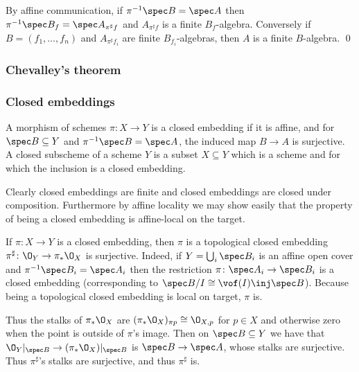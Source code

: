 \eprop

\bproof

    By affine communication, if $\pi^{-1}\spec B=\spec A$ then $\pi^{-1}\spec B_f=\spec A_{\pi^\sharp f}$ and $A_{\pi^\sharp f}$ is a finite $B_f$-algebra.
    Conversely if $B=(f_1,\dots,f_n)$ and $A_{\pi^\sharp f_i}$ are finite $B_{f_i}$-algebras, then $A$ is a finite $B$-algebra.
    \qed

\eproof

\subsubsection{Chevalley's theorem}


\subsubsection{Closed embeddings}

\bdefn

    A morphism of schemes $\pi\colon X\to Y$ is a {\emphcolor closed embedding} if it is affine, and for $\spec B\subseteq Y$ and
    $\pi^{-1}\spec B=\spec A$, the induced map $B\to A$ is surjective.
    A {\emphcolor closed subscheme} of a scheme $Y$ is a subset $X\subseteq Y$ which is a scheme and for which the inclusion is a closed
    embedding.

\edefn

Clearly closed embeddings are finite and closed embeddings are closed under composition.
Furthermore by affine locality we may show easily that the property of being a closed embedding is affine-local on the target.

\bremark

    If $\pi\colon X\to Y$ is a closed embedding, then $\pi$ is a topological closed embedding $\pi^\sharp\colon\O_Y\to\pi_*\O_X$ is surjective.
    Indeed, if $Y=\bigcup_i\spec B_i$ is an affine open cover and $\pi^{-1}\spec B_i=\spec A_i$ then the restriction
    $\pi\colon\spec A_i\to\spec B_i$ is a closed embedding (corresponding to $\spec B/I\cong\vof(I)\inj\spec B$).
    Because being a topological closed embedding is local on target, $\pi$ is.

    Thus the stalks of $\pi_*\O_X$ are $(\pi_*\O_X)_{\pi p}\cong\O_{X,p}$ for $p\in X$ and otherwise zero when the point is outside of
    $\pi$'s image.
    Then on $\spec B\subseteq Y$ we have that $\O_Y|_{\spec B}\to(\pi_*\O_X)|_{\spec B}$ is $\spec B\to\spec A$, whose stalks are surjective.
    Thus $\pi^\sharp$'s stalks are surjective, and thus $\pi^\sharp$ is.

